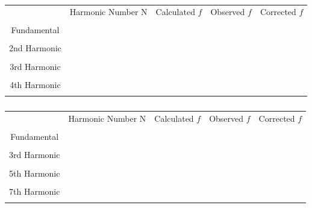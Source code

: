 \documentclass[11pt]{NSF}
\begin{document}
%
\begin{table}[hbtp]
\caption{} \label{t:1}
\begin{tabular}{| c | c | c | c | c |}
\hline
  & Harmonic Number N & Calculated $f$ & Observed $f$ & Corrected $f$ \\ &  &  &  & \\
\hline
 Fundamental &  &  &  &   \\  &  &  &  & \\
\hline
 2nd Harmonic &  &  &  &  \\ &  &  &  & \\
\hline
3rd Harmonic  &  &  &  &  \\ &  &  &  & \\
\hline
 4th Harmonic &  &  &  &  \\ &  &  &  & \\
\hline
\end{tabular}

\caption{} \label{t:2}
\begin{tabular}{| c | c | c | c | c |}
\hline
  & Harmonic Number N & Calculated $f$ & Observed $f$ & Corrected $f$ \\ &  &  &  & \\
\hline
 Fundamental &  &  &  &   \\  &  &  &  & \\
\hline
 3rd Harmonic &  &  &  &  \\ &  &  &  & \\
\hline
5th Harmonic  &  &  &  &  \\ &  &  &  & \\
\hline
7th Harmonic &  &  &  &  \\ &  &  &  & \\
\hline
\end{tabular}
\end{table}
%
\end{document}
